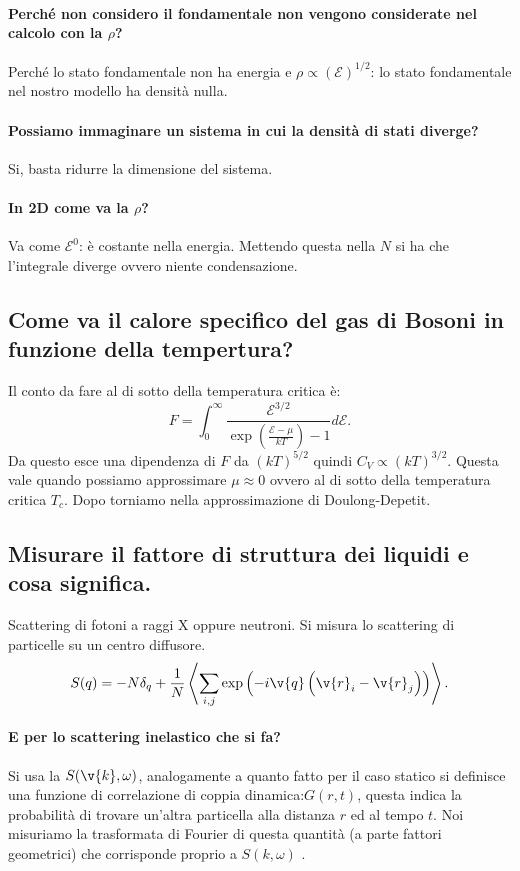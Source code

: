 \paragraph{Perché non considero il fondamentale non vengono considerate nel calcolo con la $\rho$?}%
Perché lo stato fondamentale non ha energia e $\rho  \propto\left(\mathcal{E}\right)^{1 /2}$: lo stato fondamentale nel nostro modello ha densità nulla.
\paragraph{Possiamo immaginare un sistema in cui la densità di stati diverge?}%
\label{par:Possiamo immaginare un sistema in cui la densità di stati diverge?}
Si, basta ridurre la dimensione del sistema.
\paragraph{In 2D come va la $\rho$?}%
Va come $\mathcal{E}^0$: è costante nella energia. Mettendo questa nella $N$ si ha che l'integrale diverge ovvero niente condensazione.
\subsection{Come va il calore specifico del gas di Bosoni in funzione della tempertura?}%
Il conto da fare al di sotto della temperatura critica è:
\[
 F = \int_{0}^{\infty} \frac{\mathcal{E}^{3 /2}}{\exp\left(\frac{\mathcal{E}-\mu}{kT}\right)-1}d\mathcal{E} 
.\] 
Da questo esce una dipendenza di $F$ da $\left(kT\right)^{5 /2}$ quindi $C_V \propto \left(kT\right)^{3 /2}$.
Questa vale quando possiamo approssimare $\mu\approx 0$ ovvero al di sotto della temperatura critica $T_c$.
Dopo torniamo nella approssimazione di Doulong-Depetit.
\subsection{Misurare il fattore di struttura dei liquidi e cosa significa.}%
\label{sub:Misurare il fattore di struttura dei liquidi e cosa significa.}
Scattering di fotoni a raggi X oppure neutroni. Si misura lo scattering di particelle su un centro diffusore.
\[
    S(q) = -N\delta_q + \frac{1}{N}\left< \sum_{i,j}^{} \exp\left(-i\v{q}\left(\v{r}_i-\v{r}_j\right)\right)\right>
.\] 
\paragraph{E per lo scattering inelastico che si fa?}%
\label{par:E per lo scattering inelastico che si fa?}
Si usa la $S(\v{k},\omega)$, analogamente a quanto fatto per il caso statico si definisce una funzione di correlazione di coppia dinamica:$G(r,t)$, questa indica la probabilità di trovare un'altra particella alla distanza $r$ ed al tempo $t$. Noi misuriamo la trasformata di Fourier di questa quantità (a parte fattori geometrici) che corrisponde proprio a $S(k,\omega) $ .
